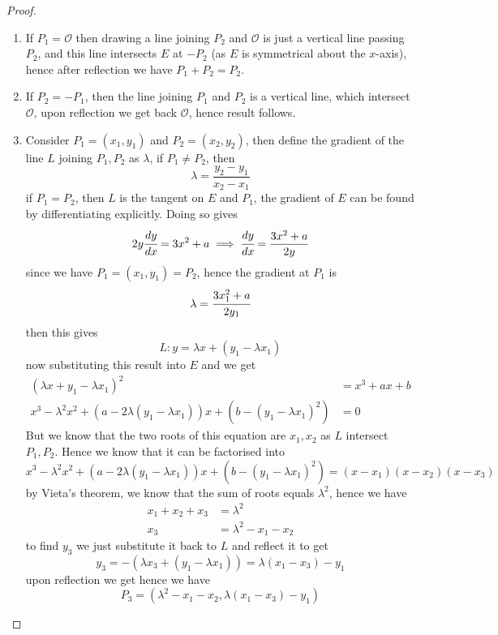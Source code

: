 \documentclass[a4 paper]{article}
\newcommand{\?}{\stackrel{?}{=}}
\begin{document}
\begin{tcolorbox}[breakable,colback=blue!5!white, colframe=blue!50!black]
\begin{proof}
\begin{enumerate}
    \item If $ P_1 = \mathcal{O} $ then drawing a line joining $ P_2  $ and $ \mathcal{O}  $ is just a vertical line passing $ P_2  $, and this line intersects $ E $ at $ -P_2  $ (as $ E $ is symmetrical about the $ x $-axis), hence after reflection we have $ P_1 + P_2 = P_2  $. 
    \item If $ P_2 = -P_1  $, then the line joining $ P_1 $ and $ P_2 $ is a vertical line, which intersect $ \mathcal{O} $, upon reflection we get back $ \mathcal{O} $, hence result follows. 
    \item Consider $ P_1  = (x_1 , y_1) $ and $ P_2 = (x_2 , y_2 ) $, then define the gradient of the line $ L $ joining $ P_1 , P_2  $ as $ \lambda $, if $ P_1 \neq P_2  $, then 
    $$ \lambda = \frac{y_2 - y_1  }{x_2 - x_1 }  $$
    if $ P_1 = P_2  $, then $ L $ is the tangent on $ E $ and $ P_1  $, the gradient of $ E $ can be found by differentiating explicitly. Doing so gives 
    $$ 2 y \cfrac{dy }{dx } = 3x^2 + a \implies \cfrac{dy }{dx } = \frac{3x^2 +a }{2y}   $$
    since we have $ P_1 = (x_1 , y_1 ) = P_2  $, hence the gradient at $ P_1  $ is 
    $$ \lambda = \cfrac{3x_1 ^2 + a}{2y_1 }  $$
    then this gives 
    $$ L : y = \lambda x + (y_1 - \lambda x_1 ) $$
    now substituting this result into $ E $ and we get 
    \begin{align*}
        (\lambda x + y_1 - \lambda x_1 )^2 & = x^3 + a x+ b \\  
        x^3 - \lambda^2 x^2 + ( a - 2 \lambda (y_1 - \lambda x_1 ))x + (b - (y_1 - \lambda x_1 )^2 ) & = 0
    \end{align*}
    But we know that the two roots of this equation are $ x_1 , x_2  $ as $ L $ intersect $ P_1 , P_2  $. Hence we know that it can be factorised into 
$$ x^3 - \lambda^2 x^2 + ( a - 2 \lambda (y_1 - \lambda x_1 ))x + (b - (y_1 - \lambda x_1 )^2 )  = (x - x_1 )(x-x_2 )(x-x_3 ) $$
by Vieta's theorem, we know that the sum of roots equals $ \lambda^2 $, hence we have 
\begin{align*}
    x_1 + x_2 + x_3 & = \lambda^2  \\ 
    x_3 & = \lambda^2 - x_1 - x_2 
\end{align*}
to find $ y_3  $ we just substitute it back to $ L $ and reflect it to get 
$$ y_3 = -(\lambda x_3 + (y_1 - \lambda x_1 )) = \lambda(x_1 - x_3 ) -y_1  $$
upon reflection we get 
hence we have 
$$ P_3 = (\lambda^2 - x_1 - x_2 , \lambda(x_1 - x_3 ) -y_1 ) $$
\end{enumerate}


\end{proof}
\end{tcolorbox}
\end{document}
